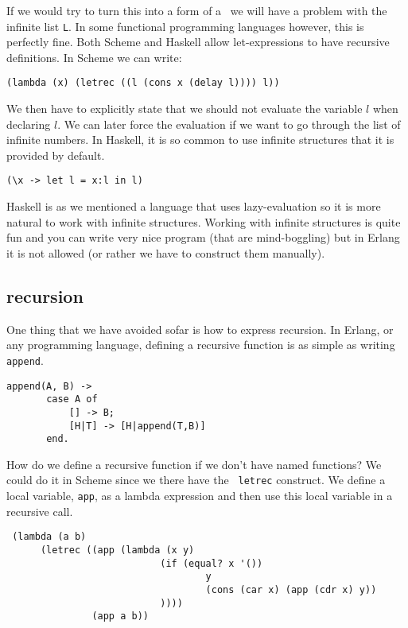 \documentclass[a4paper,11pt]{article}
\begin{document}
If we would try to turn this into a form of a \lame\ we will have a
problem with the infinite list {\tt L}. In some functional
programming languages however, this is perfectly fine. Both Scheme and
Haskell allow let-expressions to have recursive definitions. In Scheme
we can write:

\begin{center}{\tt  (lambda (x) (letrec ((l (cons x (delay l)))) l))}
\end{center}

We then have to explicitly state that we should not evaluate the
variable $l$ when declaring $l$. We can later force the evaluation if
we want to go through the list of infinite numbers. In Haskell, it is
so common to use infinite structures that it is provided by default. 

\begin{center}{\tt  (\textbackslash x  -> let  l = x:l  in  l)}
\end{center}

Haskell is as we mentioned a language that uses lazy-evaluation so it
is more natural to work with infinite structures. Working with
infinite structures is quite fun and you can write very nice program
(that are mind-boggling) but in Erlang it is not allowed (or rather we
have to construct them manually).

\subsection{recursion}

One thing that we have avoided sofar is how to express recursion. In
Erlang, or any programming language, defining a recursive function is
as simple as writing {\tt append}.

\begin{verbatim}
append(A, B) -> 
       case A of
           [] -> B;
           [H|T] -> [H|append(T,B)]
       end.         
\end{verbatim}

How do we define a recursive function if we don't have named
functions? We could do it in Scheme since we there have the {\tt
  letrec} construct. We define a local variable, {\tt app}, as a
lambda expression and then use this local variable in a recursive
call.

\vspace{10pt}

\begin{verbatim}
 (lambda (a b) 
      (letrec ((app (lambda (x y) 
                           (if (equal? x '()) 
                                   y 
                                   (cons (car x) (app (cdr x) y))
                           )))) 
               (app a b))
\end{verbatim}
\vspace{10pt}
\end{document}
